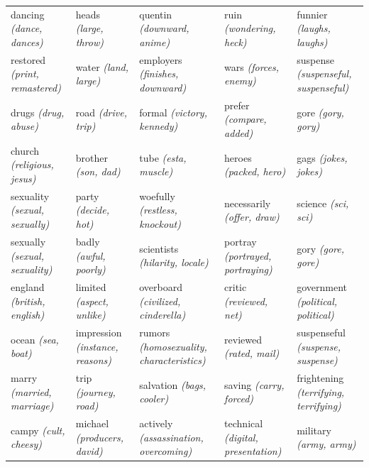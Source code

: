\begin{landscape}
\begin{table}[]
\begin{tabular}{lllll}
			dancing \textit{(dance, dances)}           & heads \textit{(large, throw)}             & quentin \textit{(downward, anime)}               & ruin \textit{(wondering, heck)}             & funnier \textit{(laughs, laughs)}             \\
			restored \textit{(print, remastered)}      & water \textit{(land, large)}              & employers \textit{(finishes, downward)}          & wars \textit{(forces, enemy)}               & suspense \textit{(suspenseful, suspenseful)}  \\
			drugs \textit{(drug, abuse)}               & road \textit{(drive, trip)}               & formal \textit{(victory, kennedy)}               & prefer \textit{(compare, added)}            & gore \textit{(gory, gory)}                    \\
			church \textit{(religious, jesus)}         & brother \textit{(son, dad)}               & tube \textit{(esta, muscle)}                     & heroes \textit{(packed, hero)}              & gags \textit{(jokes, jokes)}                  \\
			sexuality \textit{(sexual, sexually)}      & party \textit{(decide, hot)}              & woefully \textit{(restless, knockout)}           & necessarily \textit{(offer, draw)}          & science \textit{(sci, sci)}                   \\
			sexually \textit{(sexual, sexuality)}      & badly \textit{(awful, poorly)}            & scientists \textit{(hilarity, locale)}           & portray \textit{(portrayed, portraying)}    & gory \textit{(gore, gore)}                    \\
			england \textit{(british, english)}        & limited \textit{(aspect, unlike)}         & overboard \textit{(civilized, cinderella)}       & critic \textit{(reviewed, net)}             & government \textit{(political, political)}    \\
			ocean \textit{(sea, boat)}                 & impression \textit{(instance, reasons)}   & rumors \textit{(homosexuality, characteristics)} & reviewed \textit{(rated, mail)}             & suspenseful \textit{(suspense, suspense)}     \\
			marry \textit{(married, marriage)}         & trip \textit{(journey, road)}             & salvation \textit{(bags, cooler)}                & saving \textit{(carry, forced)}             & frightening \textit{(terrifying, terrifying)} \\
			campy \textit{(cult, cheesy)}              & michael \textit{(producers, david)}       & actively \textit{(assassination, overcoming)}    & technical \textit{(digital, presentation)}  & military \textit{(army, army)}                \\

\end{tabular}
\end{table}
\end{landscape}
